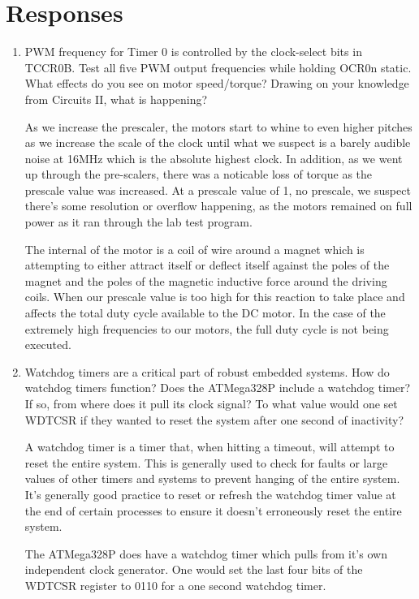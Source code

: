 \documentclass[letterpaper,11pt]{texMemo} %
\begin{document}
\section*{Responses}
\begin{enumerate}
\item  PWM frequency for Timer 0 is controlled by the clock-select bits in TCCR0B. Test all five
PWM output frequencies while holding OCR0n static. What effects do you see on motor
speed/torque? Drawing on your knowledge from Circuits II, what is happening?

As we increase the prescaler, the motors start to whine to even higher pitches as we increase the scale
of the clock until what we suspect is a barely audible noise at 16MHz which is the absolute highest clock.
In addition, as we went up through the pre-scalers, there was a noticable loss of torque as the prescale value 
was increased. At a prescale value of 1, no prescale, we suspect there's some resolution or overflow happening, as 
the motors remained on full power as it ran through the lab test program.

The internal of the motor is a coil of wire around a magnet which is attempting to either attract itself 
or deflect itself against the poles of the magnet and the poles of the magnetic inductive force around the 
driving coils. When our prescale value is too high for this reaction to take place and affects the total duty
cycle available to the DC motor. In the case of the extremely high frequencies to our motors, the full duty 
cycle is not being executed.



\item  Watchdog timers are a critical part of robust embedded systems. How do watchdog timers
function? Does the ATMega328P include a watchdog timer? If so, from where does it pull
its clock signal? To what value would one set WDTCSR if they wanted to reset the system
after one second of inactivity?

A watchdog timer is a timer that, when hitting a timeout, will attempt to reset the entire 
system. This is generally used to check for faults or large values of other timers and systems 
to prevent hanging of the entire system. It's generally good practice to reset or refresh the watchdog 
timer value at the end of certain processes to ensure it doesn't erroneously reset the entire system.

The ATMega328P does have a watchdog timer which pulls from it's own independent clock generator. One 
would set the last four bits of the WDTCSR register to 0110 for a one second watchdog timer.


\end{enumerate} 
\end{document}
